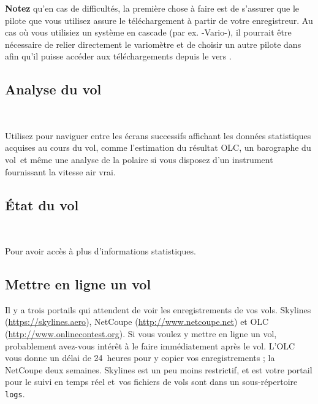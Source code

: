 \documentclass[french, a4paper, 12pt]{refrep}
\newcommand{\info}[3]{\bmenut{Info}{#1/3}{\LARGE$\triangleright$}~\bmenut{#2}{#3}}%
\begin{document}

\textbf{Notez} qu'en cas de difficultés, la première chose à faire est de s'assurer que le pilote
que vous utilisez assure le téléchargement à partir de votre enregistreur. Au cas où vous utilisiez un système
en cascade (par ex. \fl-Vario-\xc), il pourrait être nécessaire de relier directement
le variomètre et de choisir un autre pilote dans \xc{} afin qu'il puisse accéder aux
téléchargements depuis le \fl{} vers \xc.

\subsection{\textcolor{flashblue}{Analyse du vol}}
\begin{flushleft}\hspace*{1cm}\info{1}{Analyse}{}\\\end{flushleft}
Utilisez \bmenuw{\blink} pour naviguer entre les écrans successifs affichant les données statistiques
acquises au cours du vol, comme l'estimation du résultat OLC, un barographe du vol\textellipsis\
 et même une analyse de la polaire si vous disposez d'un instrument
fournissant la vitesse air vrai.

\subsection{\textcolor{flashblue}{État du vol}}
\begin{flushleft}\hspace*{1cm}\info{2}{État}{}\blink{}\\\end{flushleft}
Pour avoir accès à plus d'informations statistiques.

\subsection{\textcolor{flashblue}{Mettre en ligne un vol}}

Il y a trois portails qui attendent de voir les enregistrements de vos vols.
Skylines (\url{https://skylines.aero}), NetCoupe (\url{http://www.netcoupe.net})
et OLC (\url{http://www.onlinecontest.org}).
Si vous voulez y mettre en ligne un vol, probablement avez-vous intérêt à le faire immédiatement après le vol. L'OLC vous donne un délai de 24~heures pour y copier vos enregistrements ;  la NetCoupe deux semaines.
Skylines est un peu moins restrictif, et est votre portail pour le suivi en temps réel et\textellipsis\
vos fichiers de vols sont dans un sous-répertoire \texttt{logs}.
\end{document}
